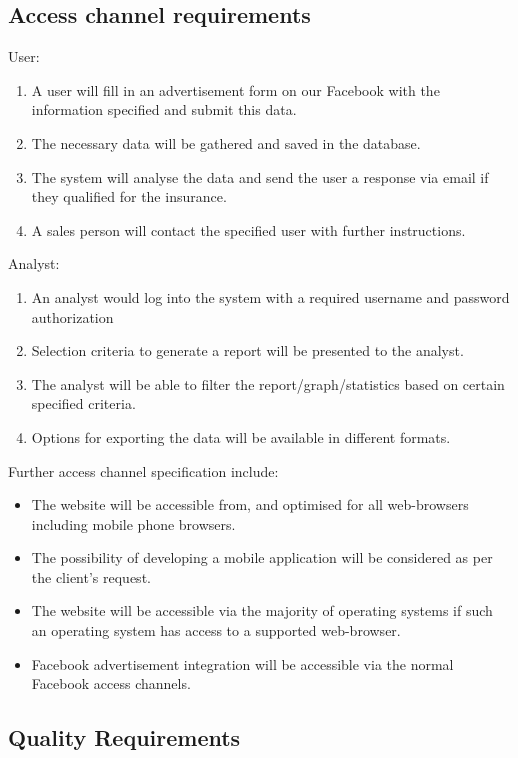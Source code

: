\documentclass{article}
\begin{document}
	\subsection{Access channel requirements}
	User: 
	\begin{enumerate}
		\item A user will fill in an advertisement form on our Facebook with the information specified and submit this data.
		\item The necessary data will be gathered and saved in the database.
		\item The system will analyse the data and send the user a response via email if they qualified for the insurance.
		\item A sales person will contact the specified user with further instructions.
	\end{enumerate}
	\clearpage
	Analyst: 
	\begin{enumerate}
		\item An analyst would log into the system with a required username and password authorization
		\item Selection criteria to generate a report will be presented to the analyst.
		\item The analyst will be able to filter the report/graph/statistics based on certain specified criteria.
		\item Options for exporting the data will be available in different formats.
	\end{enumerate}
	Further access channel specification include:
	\begin{itemize}
		\item The website will be accessible from, and optimised for all web-browsers including mobile phone browsers.
		\item The possibility of developing a mobile application will be considered as per the client's request.
		\item The website will be accessible via the majority of operating systems if such an operating system has access to a supported web-browser.
		\item Facebook advertisement integration will be accessible via the normal Facebook access channels.
	\end{itemize}
	 
	
	\subsection{Quality Requirements}
\end{document}
